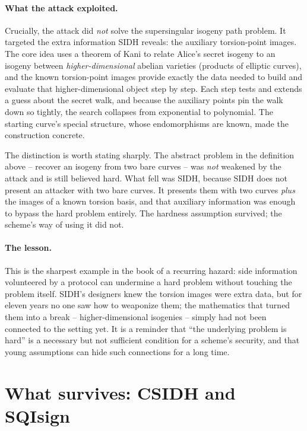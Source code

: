 \paragraph{What the attack exploited.}
Crucially, the attack did \emph{not} solve the supersingular isogeny path problem. It targeted the extra information SIDH reveals: the auxiliary torsion-point images. The core idea uses a theorem of Kani to relate Alice's secret isogeny to an isogeny between \emph{higher-dimensional} abelian varieties (products of elliptic curves), and the known torsion-point images provide exactly the data needed to build and evaluate that higher-dimensional object step by step. Each step tests and extends a guess about the secret walk, and because the auxiliary points pin the walk down so tightly, the search collapses from exponential to polynomial. The starting curve's special structure, whose endomorphisms are known, made the construction concrete.

\begin{remark}
The distinction is worth stating sharply. The abstract problem in the definition above -- recover an isogeny from two bare curves -- was \emph{not} weakened by the attack and is still believed hard. What fell was SIDH, because SIDH does not present an attacker with two bare curves. It presents them with two curves \emph{plus} the images of a known torsion basis, and that auxiliary information was enough to bypass the hard problem entirely. The hardness assumption survived; the scheme's way of using it did not.
\end{remark}

\paragraph{The lesson.}
This is the sharpest example in the book of a recurring hazard: side information volunteered by a protocol can undermine a hard problem without touching the problem itself. SIDH's designers knew the torsion images were extra data, but for eleven years no one saw how to weaponize them; the mathematics that turned them into a break -- higher-dimensional isogenies -- simply had not been connected to the setting yet. It is a reminder that ``the underlying problem is hard'' is a necessary but not sufficient condition for a scheme's security, and that young assumptions can hide such connections for a long time.

\section{What survives: CSIDH and SQIsign}

